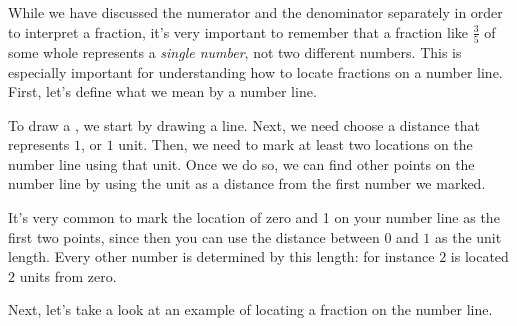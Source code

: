 \documentclass{ximera}
\begin{document}
While we have discussed the numerator and the denominator separately in order to interpret a fraction, it's very important to remember that a fraction like $\frac{3}{5}$ of some whole represents a \emph{single number}, not two different numbers. This is especially important for understanding how to locate fractions on a number line. First, let's define what we mean by a number line.
\begin{definition}
To draw a , we start by drawing a line. Next, we need choose a distance that represents $1$, or $1$ unit. Then, we need to mark at least two locations on the number line using that unit. Once we do so, we can find other points on the number line by using the unit as a distance from the first number we marked.
\begin{image}
\end{image}
\end{definition}
It's very common to mark the location of zero and 1 on your number line as the first two points, since then you can use the distance between $0$ and $1$ as the unit length. Every other number is determined by this length: for instance $2$ is located $2$ units from zero.

Next, let's take a look at an example of locating a fraction on the number line.
\end{document}
